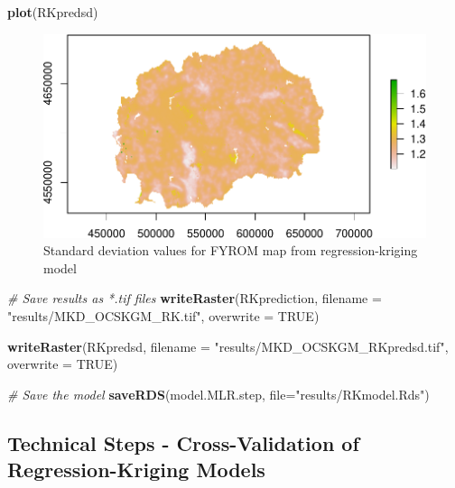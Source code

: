 \documentclass[10pt,b5paper,]{book}
\newenvironment{Shaded}{\begin{snugshade}}{\end{snugshade}}
\newcommand{\CommentTok}[1]{\textcolor[rgb]{0.56,0.35,0.01}{\textit{#1}}}
\newcommand{\DataTypeTok}[1]{\textcolor[rgb]{0.13,0.29,0.53}{#1}}
\newcommand{\KeywordTok}[1]{\textcolor[rgb]{0.13,0.29,0.53}{\textbf{#1}}}
\newcommand{\NormalTok}[1]{#1}
\newcommand{\OtherTok}[1]{\textcolor[rgb]{0.56,0.35,0.01}{#1}}
\newcommand{\StringTok}[1]{\textcolor[rgb]{0.31,0.60,0.02}{#1}}
\theoremstyle{definition}
\theoremstyle{definition}
\theoremstyle{definition}
\theoremstyle{remark}
\begin{document}
\begin{Shaded}
\begin{Highlighting}[]
\KeywordTok{plot}\NormalTok{(RKpredsd)}
\end{Highlighting}
\end{Shaded}

\begin{figure}
\centering
\includegraphics{SOCMapping_files/figure-latex/predSDRK-1.pdf}
\caption{\label{fig:predSDRK}Standard deviation values for FYROM map from
regression-kriging model}
\end{figure}

\begin{Shaded}
\begin{Highlighting}[]
\CommentTok{# Save results as *.tif files}
\KeywordTok{writeRaster}\NormalTok{(RKprediction, }\DataTypeTok{filename =} \StringTok{"results/MKD_OCSKGM_RK.tif"}\NormalTok{,}
            \DataTypeTok{overwrite =} \OtherTok{TRUE}\NormalTok{)}

\KeywordTok{writeRaster}\NormalTok{(RKpredsd, }\DataTypeTok{filename =} \StringTok{"results/MKD_OCSKGM_RKpredsd.tif"}\NormalTok{,}
            \DataTypeTok{overwrite =} \OtherTok{TRUE}\NormalTok{)}
\end{Highlighting}
\end{Shaded}

\begin{Shaded}
\begin{Highlighting}[]
\CommentTok{# Save the model}
\KeywordTok{saveRDS}\NormalTok{(model.MLR.step, }\DataTypeTok{file=}\StringTok{"results/RKmodel.Rds"}\NormalTok{)}
\end{Highlighting}
\end{Shaded}

\hypertarget{technical-steps---cross-validation-of-regression-kriging-models}{%
\subsection{Technical Steps - Cross-Validation of Regression-Kriging
Models}\label{technical-steps---cross-validation-of-regression-kriging-models}}
\end{document}
